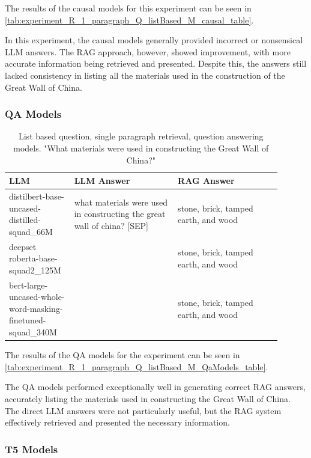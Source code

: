 \documentclass{wseas}
\begin{document}
The results of the causal models for this experiment can be seen 
in \autoref{tab:experiment_R_1_paragraph_Q_listBased_M_causal_table}.

In this experiment, the causal models generally provided incorrect or
nonsensical LLM answers. The RAG approach, however, showed improvement,
with more accurate information being retrieved and presented. Despite
this, the answers still lacked consistency in listing all the materials
used in the construction of the Great Wall of China.

\subsubsection{QA Models}

\begin{table}[htbp]
  \centering
  \caption{List based question, single paragraph retrieval, question answering models. "What materials were used in constructing the Great Wall of China?"} %
  \label{tab:experiment_R_1_paragraph_Q_listBased_M_QaModels_table}  %
  \begin{tabular}{|p{0.20\linewidth}|p{0.35\linewidth}|p{0.35\linewidth}|}
    \hline
    \textbf{LLM} & \textbf{LLM Answer} & \textbf{RAG Answer} \\
    \hline
    distilbert-base-uncased-distilled-squad\_66M & what materials were used in constructing the great wall of china? {[}SEP{]} & stone, brick, tamped earth, and wood \\
    \hline
    deepset roberta-base-squad2\_125M & & stone, brick, tamped earth, and wood \\
    \hline
    bert-large-uncased-whole-word-masking-finetuned-squad\_340M & & stone, brick, tamped earth, and wood \\
    \hline
  \end{tabular}
\end{table}

The results of the QA models for the experiment
can be seen in \autoref{tab:experiment_R_1_paragraph_Q_listBased_M_QaModels_table}.

The QA models performed exceptionally well in generating correct RAG
answers, accurately listing the materials used in constructing the Great
Wall of China. The direct LLM answers were not particularly useful, but
the RAG system effectively retrieved and presented the necessary
information.

\subsubsection{T5 Models}
\end{document}
